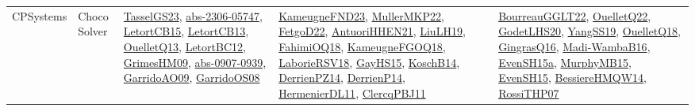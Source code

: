 {\begin{longtable}{lp{3cm}>{\raggedright}p{6cm}>{\raggedright}p{6cm}p{8cm}}
CPSystems & Choco Solver & \href{papers/TasselGS23.pdf}{TasselGS23}\cite{TasselGS23}, \href{articles/abs-2306-05747.pdf}{abs-2306-05747}\cite{abs-2306-05747}, \href{articles/LetortCB15.pdf}{LetortCB15}\cite{LetortCB15}, \href{papers/LetortCB13.pdf}{LetortCB13}\cite{LetortCB13}, \href{papers/OuelletQ13.pdf}{OuelletQ13}\cite{OuelletQ13}, \href{papers/LetortBC12.pdf}{LetortBC12}\cite{LetortBC12}, \href{papers/GrimesHM09.pdf}{GrimesHM09}\cite{GrimesHM09}, \href{articles/abs-0907-0939.pdf}{abs-0907-0939}\cite{abs-0907-0939}, \href{articles/GarridoAO09.pdf}{GarridoAO09}\cite{GarridoAO09}, \href{articles/GarridoOS08.pdf}{GarridoOS08}\cite{GarridoOS08} & \href{papers/KameugneFND23.pdf}{KameugneFND23}\cite{KameugneFND23}, \href{articles/MullerMKP22.pdf}{MullerMKP22}\cite{MullerMKP22}, \href{articles/FetgoD22.pdf}{FetgoD22}\cite{FetgoD22}, \href{papers/AntuoriHHEN21.pdf}{AntuoriHHEN21}\cite{AntuoriHHEN21}, \href{papers/LiuLH19.pdf}{LiuLH19}\cite{LiuLH19}, \href{articles/FahimiOQ18.pdf}{FahimiOQ18}\cite{FahimiOQ18}, \href{papers/KameugneFGOQ18.pdf}{KameugneFGOQ18}\cite{KameugneFGOQ18}, \href{articles/LaborieRSV18.pdf}{LaborieRSV18}\cite{LaborieRSV18}, \href{papers/GayHS15.pdf}{GayHS15}\cite{GayHS15}, \href{papers/KoschB14.pdf}{KoschB14}\cite{KoschB14}, \href{papers/DerrienPZ14.pdf}{DerrienPZ14}\cite{DerrienPZ14}, \href{papers/DerrienP14.pdf}{DerrienP14}\cite{DerrienP14}, \href{papers/HermenierDL11.pdf}{HermenierDL11}\cite{HermenierDL11}, \href{papers/ClercqPBJ11.pdf}{ClercqPBJ11}\cite{ClercqPBJ11} & \href{articles/BourreauGGLT22.pdf}{BourreauGGLT22}\cite{BourreauGGLT22}, \href{papers/OuelletQ22.pdf}{OuelletQ22}\cite{OuelletQ22}, \href{papers/GodetLHS20.pdf}{GodetLHS20}\cite{GodetLHS20}, \href{papers/YangSS19.pdf}{YangSS19}\cite{YangSS19}, \href{papers/OuelletQ18.pdf}{OuelletQ18}\cite{OuelletQ18}, \href{papers/GingrasQ16.pdf}{GingrasQ16}\cite{GingrasQ16}, \href{papers/Madi-WambaB16.pdf}{Madi-WambaB16}\cite{Madi-WambaB16}, \href{articles/EvenSH15a.pdf}{EvenSH15a}\cite{EvenSH15a}, \href{papers/MurphyMB15.pdf}{MurphyMB15}\cite{MurphyMB15}, \href{papers/EvenSH15.pdf}{EvenSH15}\cite{EvenSH15}, \href{papers/BessiereHMQW14.pdf}{BessiereHMQW14}\cite{BessiereHMQW14}, \href{papers/RossiTHP07.pdf}{RossiTHP07}\cite{RossiTHP07}\\

\end{longtable}}
